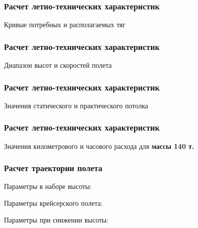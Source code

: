 \documentclass{beamer}
\begin{document}
\begin{frame}
    \frametitle{Расчет летно-технических характеристик}
    \begin{center}
    Кривые потребных и располагаемых тяг
    \resizebox{\textwidth}{!}{
    {}
    }
    \end{center}
\end{frame}

\begin{frame}
    \frametitle{Расчет летно-технических характеристик}
    \begin{center}
    Диапазон высот и скоростей полета 
\resizebox{0.75\textwidth}{!}{
{}
}
\end{center}
\end{frame}

\begin{frame}[t]
    \frametitle{Расчет летно-технических характеристик}
    \begin{center}
        Значения статического и практического потолка
        \resizebox{.70\linewidth}{!}{}
    \end{center}
\end{frame}
\begin{frame}[t]
    \frametitle{Расчет летно-технических характеристик}
    \begin{center}
        Значения километрового и часового расхода для \textbf{массы 140 т.}
        \resizebox{.70\linewidth}{!}{}
    \end{center}
\end{frame}
\begin{frame}[t]
    \frametitle{Расчет траектории полета}

    \begin{center}
        Параметры в наборе высоты:

        
        \vfill

        Параметры крейсерского полета:

        
        \vfill
        Параметры  при снижении высоты:

        
    \end{center}
\end{frame}
\end{document}
